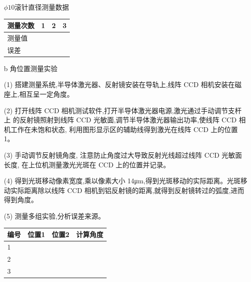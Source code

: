 \documentclass{ctexart}
\begin{document}
$\phi 10$滚针直径测量数据

\begin{tabular}{|p{5em}|p{5em}|p{5em}|p{5em}|}
	\hline 
        测量次数 & 1& 2&3     \\
	\hline
	测量值 & & &  \\
	\hline
	误差 & & &  \\
	\hline	
\end{tabular}

b 角位置测量实验

(1) 搭建测量系统,半导体激光器、反射镜安装在导轨上,线阵 CCD 相机安装在磁座上,相互呈一定角度。

(2) 打开线阵 CCD 相机测试软件,打开半导体激光器电源,激光通过手动调节支杆上
的反射镜照射到线阵 CCD 光敏面,调节半导体激光器输出功率,使线阵 CCD 相
机工作在未饱和状态,
利用图形显示区的辅助线得到激光在线阵 CCD 上的位置 1。

(3) 手动调节反射镜角度,
注意防止角度过大导致反射光线超过线阵 CCD 光敏面长度,
在上位机测量激光光斑在 CCD 上的位置并记录。

(4) 得到光斑移动像素宽度,乘以像素大小 14μm,得到光斑移动的实际距离。光斑移
动实际距离除以线阵 CCD 相机到铝反射镜的距离,就得到反射镜转过的弧度,进而得到角度。

(5) 测量多组实验,分析误差来源。

\begin{tabular}{|p{5em}|p{5em}|p{5em}|p{5em}|}
	\hline 
        编号 & 位置1& 位置2&计算角度     \\
	\hline
	1& & &  \\
	\hline
	2 & & &  \\
	\hline
	3 & & &  \\
	\hline
\end{tabular}
\end{document}
